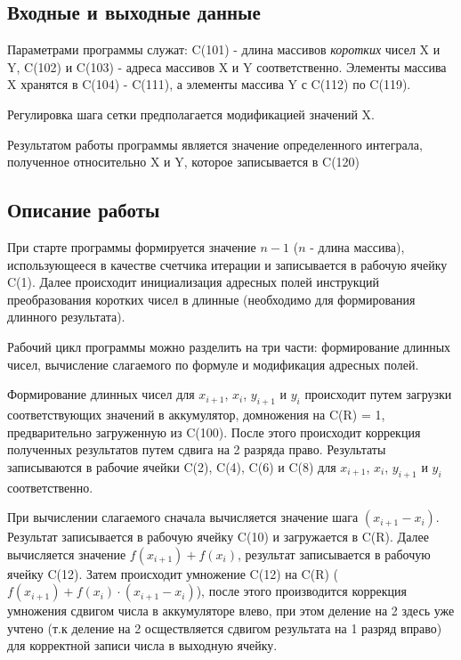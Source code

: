 \subsection{Входные и выходные данные}
Параметрами программы служат: C(101) - длина массивов \textit{коротких} чисел X и Y, C(102) и C(103) - адреса массивов X и Y соответственно. Элементы массива X хранятся в C(104) - C(111), а элементы массива Y с C(112) по C(119). 

Регулировка шага сетки предполагается модификацией значений X.

Результатом работы программы является значение определенного интеграла, полученное относительно X и Y, которое записывается в  C(120)

\subsection{Описание работы}
При старте программы формируется значение $n-1$ ($n$ - длина массива), использующееся в качестве счетчика итерации и записывается в рабочую ячейку C(1). Далее происходит инициализация адресных полей инструкций преобразования коротких чисел в длинные (необходимо для формирования длинного результата).
\makeatletter
\def\lst@PlaceNumber{\llap{\normalfont
                \lst@numberstyle{\the\lst@lineno}\kern\lst@numbersep}}
\makeatother


\parindent=1cm

Рабочий цикл программы можно разделить на три части: формирование длинных чисел, вычисление слагаемого по формуле и модификация адресных полей.

Формирование длинных чисел для $x_{i+1}$, $x_i$, $y_{i+1}$ и $y_i$ происходит путем загрузки соответствующих значений в аккумулятор, домножения на C(R) = 1, предварительно загруженную из C(100). После этого происходит коррекция полученных результатов путем сдвига на 2 разряда право. Результаты записываются в рабочие ячейки C(2), C(4), C(6) и C(8) для $x_{i+1}$, $x_i$, $y_{i+1}$ и $y_i$ соответственно.
\newline
\newline

\parindent=1cm

При вычислении слагаемого сначала вычисляется значение шага $(x_{i+1} - x_i)$. Результат записывается в рабочую ячейку C(10)
и загружается в C(R). Далее вычисляется значение $f(x_{i+1}) + f(x_i)$, результат записывается в рабочую ячейку C(12). Затем происходит умножение C(12) на C(R) ($f(x_{i+1}) + f(x_i) \cdot (x_{i+1} - x_i)$), после этого производится коррекция умножения сдвигом числа в аккумуляторе влево, при этом деление на 2 здесь уже учтено (т.к деление на 2 осществляется сдвигом результата на 1 разряд вправо) для корректной записи числа в выходную ячейку. 

